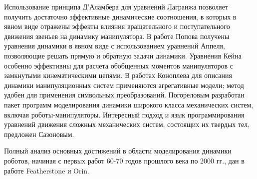 Использование принципа Д'Аламбера для уравнений Лагранжа позволяет получить достаточно эффективные динамические соотношения, в которых в явном виде отражены эффекты влияния вращательного и поступательного движения звеньев на динамику манипулятора. В работе Попова получены уравнения динамики в явном виде с использованием уравнений Аппеля, позволяющие решать прямую и обратную задачи динамики. Уравнения Кейна особенно эффективны для расчета обобщенных моментов манипуляторов с замкнутыми кинематическими цепями. В работах Коноплева для описания динамики манипуляционных систем применяются агрегативные модели; метод удобен для применения символьных преобразований. Погореловым разработан пакет программ моделирования динамики широкого класса механических систем, включая роботы-манипуляторы. Интересный подход и язык программирования уравнений движения сложных механических систем, состоящих их твердых тел, предложен Сазоновым.

Полный анализ основных достижений в области моделирования динамики роботов, начиная с первых работ 60-70 годов прошлого века по 2000 гг., дан в работе Featherstone и Orin.

